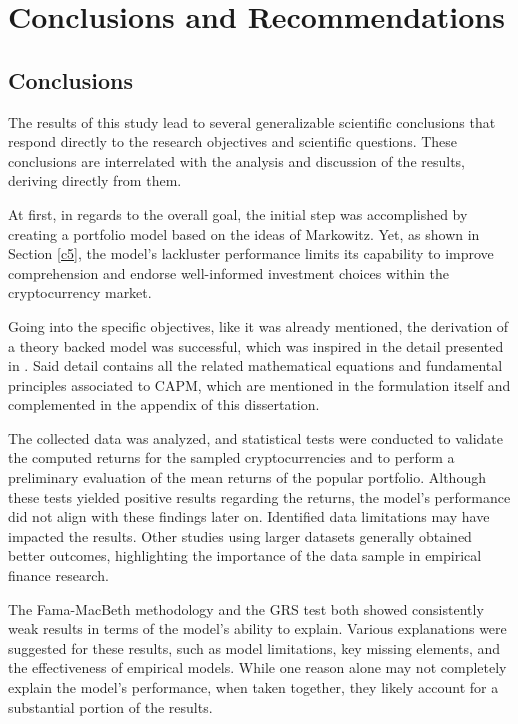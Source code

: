 \chapter{Conclusions and Recommendations}
\label{c6}

\section{Conclusions}
The results of this study lead to several generalizable scientific conclusions that respond directly to the research objectives and scientific questions. These conclusions are interrelated with the analysis and discussion of the results, deriving directly from them.

At first, in regards to the overall goal, the initial step was accomplished by creating a portfolio model based on the ideas of Markowitz. Yet, as shown in Section \ref{c5}, the model's lackluster performance limits its capability to improve comprehension and endorse well-informed investment choices within the cryptocurrency market.

Going into the specific objectives, like it was already mentioned, the derivation of a theory backed model was successful, which was inspired in the detail presented in \parencite{luo2017social}. Said detail contains all the related mathematical equations and fundamental principles associated to CAPM, which are mentioned in the formulation itself and complemented in the appendix of this dissertation.

The collected data was analyzed, and statistical tests were conducted to validate the computed returns for the sampled cryptocurrencies and to perform a preliminary evaluation of the mean returns of the popular portfolio. Although these tests yielded positive results regarding the returns, the model's performance did not align with these findings later on. Identified data limitations may have impacted the results. Other studies using larger datasets generally obtained better outcomes, highlighting the importance of the data sample in empirical finance research.

The Fama-MacBeth methodology and the GRS test both showed consistently weak results in terms of the model's ability to explain. Various explanations were suggested for these results, such as model limitations, key missing elements, and the effectiveness of empirical models. While one reason alone may not completely explain the model's performance, when taken together, they likely account for a substantial portion of the results. 


